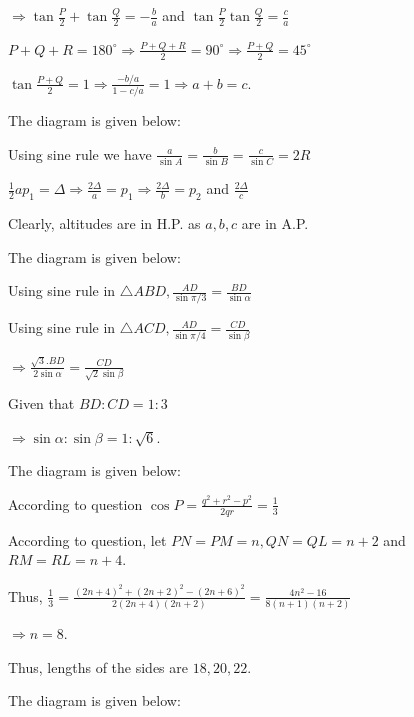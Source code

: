   $\Rightarrow \tan\frac{P}{2} + \tan\frac{Q}{2} = -\frac{b}{a}$ and $\tan\frac{P}{2}\tan\frac{Q}{2}
  = \frac{c}{a}$

  $P + Q + R = 180^\circ \Rightarrow \frac{P + Q + R}{2} = 90^\circ \Rightarrow \frac{P + Q}{2} = 45^\circ$

  $\tan\frac{P + Q}{2} = 1\Rightarrow \frac{-b/a}{1 - c/a} = 1\Rightarrow a + b = c$.
\item The diagram is given below:

  \startplacefigure
    \externalfigure[17_13.pdf]
  \stopplacefigure

  Using sine rule we have $\frac{a}{\sin A} = \frac{b}{\sin B} = \frac{c}{\sin C} = 2R$

  $\frac{1}{2}ap_1 = \Delta \Rightarrow \frac{2\Delta}{a} = p_1 \Rightarrow \frac{2\Delta}{b} = p_2$ and
  $\frac{2\Delta}{c}$

  Clearly, altitudes are in H.P. as $a, b, c$ are in A.P.
\item The diagram is given below:

  \startplacefigure
    \externalfigure[17_14.pdf]
  \stopplacefigure

  Using sine rule in $\triangle ABD, \frac{AD}{\sin\pi/3} = \frac{BD}{\sin\alpha}$

  Using sine rule in $\triangle ACD, \frac{AD}{\sin\pi/4} = \frac{CD}{\sin\beta}$

  $\Rightarrow \frac{\sqrt{3}.BD}{2\sin\alpha} = \frac{CD}{\sqrt{2}\sin\beta}$

  Given that $BD:CD = 1:3$

  $\Rightarrow \sin\alpha:\sin\beta = 1:\sqrt{6}$.
\item The diagram is given below:

  \startplacefigure
    \externalfigure[17_15.pdf]
  \stopplacefigure

  According to question $\cos P = \frac{q^2 + r^2 - p^2}{2qr} = \frac{1}{3}$

  According to question, let $PN = PM = n, QN = QL = n + 2$ and $RM = RL = n + 4$.

  Thus, $\frac{1}{3} = \frac{(2n + 4)^2 + (2n + 2)^2 - (2n + 6)^2}{2(2n + 4)(2n + 2)} = \frac{4n^2 - 16}{8(n
    + 1)(n + 2)}$

  $\Rightarrow n = 8$.

  Thus, lengths of the sides are $18, 20, 22$.
\item The diagram is given below:

  \startplacefigure
    \externalfigure[17_16.pdf]
  \stopplacefigure

